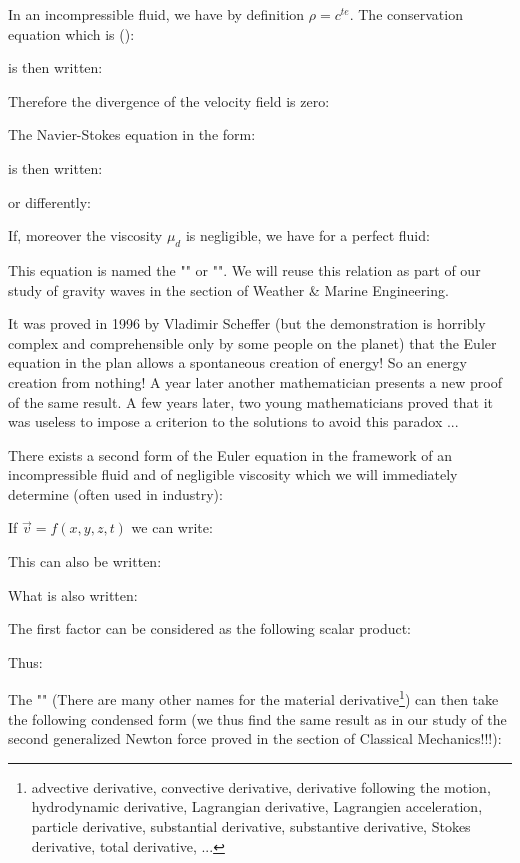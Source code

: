 	In an incompressible fluid, we have by definition $\rho=c^{te}$. The conservation equation which is ():
	
	is then written:
	
	Therefore the divergence of the velocity field is zero:
	
	The Navier-Stokes equation in the form:
	
	is then written:
	
	or differently:
	
	If, moreover the viscosity $\mu_d$ is negligible, we have for a perfect fluid:
	
	This equation is named the "" or "". We will reuse this relation as part of our study of gravity waves in the section of Weather \& Marine Engineering.
	\begin{tcolorbox}[title=Remark,colframe=black,arc=10pt]
	It was proved in 1996 by Vladimir Scheffer (but the demonstration is horribly complex and comprehensible only by some people on the planet) that the Euler equation in the plan allows a spontaneous creation of energy! So an energy creation from nothing! A year later another mathematician presents a new proof of the same result. A few years later, two young mathematicians proved that it was useless to impose a criterion to the solutions to avoid this paradox ...
	\end{tcolorbox}
	There exists a second form of the Euler equation in the framework of an incompressible fluid and of negligible viscosity which we will immediately determine (often used in industry):

	If $\vec{v}=f(x,y,z,t)$ we can write:
	
	This can also be written:
	
	What is also written:
	
	The first factor can be considered as the following scalar product:
	
	Thus:
	
	The "" (There are many other names for the material derivative\footnote{advective derivative, convective derivative, derivative following the motion,  hydrodynamic derivative, Lagrangian derivative, Lagrangien acceleration, particle derivative, substantial derivative, substantive derivative, Stokes derivative, total derivative, ...}) can then take the following condensed form (we thus find the same result as in our study of the second generalized  Newton force proved in the section of Classical Mechanics!!!):
	
